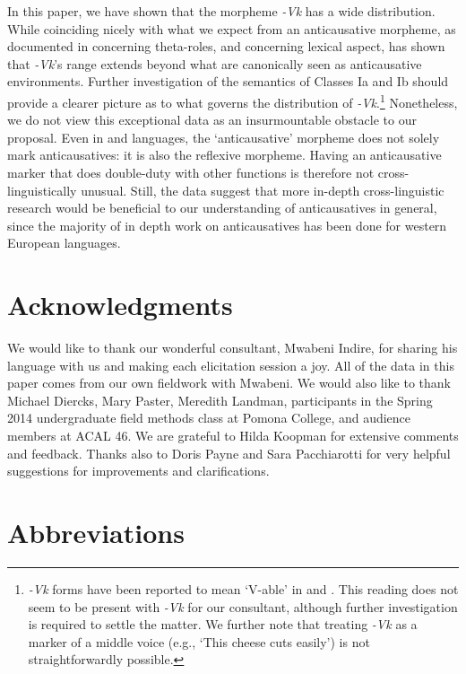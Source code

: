 \documentclass[output=paper]{langsci/lanmgscibook}
\begin{document}
In this paper, we have shown that the  morpheme \textit{-Vk} has a wide distribution. While coinciding nicely with what we expect from an anticausative morpheme, as documented in  concerning theta-roles, and  concerning lexical aspect,  has shown that \textit{-Vk}’s range extends beyond what are canonically seen as anticausative environments. Further investigation of the semantics of Classes Ia and Ib should provide a clearer picture as to what governs the distribution of \textit{-Vk}.\footnote{\textit{-Vk} forms have been reported to mean ‘V-able’ in  \citep{Simango2009} and  \citep{Fernando2013}. This reading does not seem to be present with \textit{-Vk} for our consultant, although further investigation is required to settle the matter. We further note that treating \textit{-Vk} as a marker of a middle voice (e.g., ‘This cheese cuts easily’) is not straightforwardly possible.} Nonetheless, we do not view this exceptional data as an insurmountable obstacle to our proposal. Even in  and  languages, the ‘anticausative’ morpheme does not solely mark anticausatives: it is also the reflexive morpheme. Having an anticausative marker that does double-duty with other functions is therefore not cross-linguistically unusual. Still, the  data suggest that more in-depth cross-linguistic research would be beneficial to our understanding of anticausatives in general, since the majority of in depth work on anticausatives has been done for western European languages.

\section*{Acknowledgments}

We would like to thank our wonderful  consultant, Mwabeni Indire, for sharing his language with us and making each elicitation session a joy. All of the  data in this paper comes from our own fieldwork with Mwabeni. We would also like to thank Michael Diercks, Mary Paster, Meredith Landman, participants in the Spring 2014 undergraduate field methods class at Pomona College, and audience members at ACAL 46. We are grateful to Hilda Koopman for extensive comments and feedback. Thanks also to Doris Payne and Sara Pacchiarotti for very helpful suggestions for improvements and clarifications.

\section*{Abbreviations}
\end{document}
